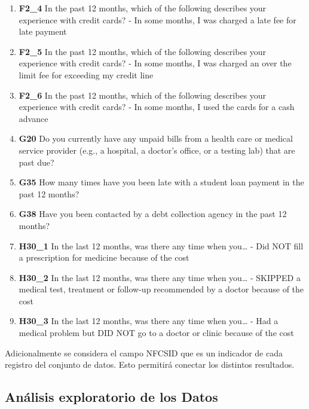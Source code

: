 \documentclass[a4paper, 11pt, bibliography=numbered, es]{article}
\begin{document}
\begin{enumerate}
    \item \textbf{F2\_4} In the past 12 months, which of the following describes your experience with credit cards? - In some months, I was charged a late fee for late payment 
    \item \textbf{F2\_5} In the past 12 months, which of the following describes your experience with credit cards? - In some months, I was charged an over the limit fee for exceeding my credit line 
    \item \textbf{F2\_6} In the past 12 months, which of the following describes your experience with credit cards? - In some months, I used the cards for a cash advance 
    \item \textbf{G20} Do you currently have any unpaid bills from a health care or medical service provider (e.g., a hospital,
     a doctor's office, or a testing lab) that are past due?
    \item \textbf{G35} How many times have you been late with a student loan payment in the past 12 months?
    \item \textbf{G38} Have you been contacted by a debt collection agency in the past 12 months?
    \item \textbf{H30\_1} In the last 12 months, was there any time when you… - Did NOT fill a prescription for medicine because of the cost
    \item \textbf{H30\_2} In the last 12 months, was there any time when you… - SKIPPED a medical test, treatment or follow-up recommended by a doctor because of the cost
    \item \textbf{H30\_3} In the last 12 months, was there any time when you… - Had a medical problem but DID NOT go to a doctor or clinic because of the cost
\end{enumerate}

Adicionalmente se considera el campo NFCSID que es un indicador de cada registro
del conjunto de datos. Esto permitirá conectar los distintos resultados.

\subsection{Análisis exploratorio de los Datos}
\printbibliography 
\end{document}
